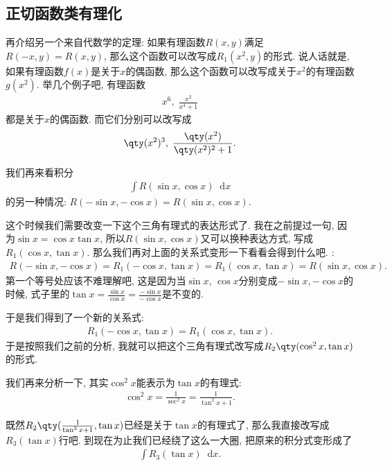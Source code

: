 \documentclass{ctexbook}
\newcommand*{\dif}{\mathop{}\!\mathrm{d}}
\begin{document}
{\subsection{正切函数类有理化}
再介绍另一个来自代数学的定理: 如果有理函数$R(x,y)$满足$R(-x,y)=R(x,y)$, 那么这个函数可以改写成$R_{1}(x^{2},y)$的形式. 说人话就是, 如果有理函数$f(x)$是关于$x$的偶函数, 那么这个函数可以改写成关于$x^{2}$的有理函数$g(x^{2})$. 举几个例子吧, 有理函数
\begin{align*}
x^{6},\;\frac{x^{2}}{x^{4}+1}
\end{align*}
都是关于$x$的偶函数. 而它们分别可以改写成
\begin{align*}
\qty(x^{2})^{3},\;\frac{\qty(x^{2})}{\qty(x^{2})^{2}+1}
.\end{align*}\par
我们再来看积分
\begin{align*}
\int R(\sin{x},\cos{x})\dif{x}
\end{align*}
的另一种情况: $R(-\sin{x},-\cos{x})=R(\sin{x},\cos{x})$. \par
这个时候我们需要改变一下这个三角有理式的表达形式了. 我在之前提过一句, 因为$\sin{x}=\cos{x}\tan{x}$, 所以$R(\sin{x},\cos{x})$又可以换种表达方式, 写成$R_{1}(\cos{x},\tan{x})$. 那么我们再对上面的关系式变形一下看看会得到什么吧. :
\begin{align*}
R(-\sin{x},-\cos{x})=R_{1}(-\cos{x},\tan{x})=R_{1}(\cos{x},\tan{x})=R(\sin{x},\cos{x})
.\end{align*}
第一个等号处应该不难理解吧, 这是因为当$\sin{x},\,\cos{x}$分别变成$-\sin{x},-\cos{x}$的时候, 式子里的$\tan{x}=\frac{\sin{x}}{\cos{x}}=\frac{-\sin{x}}{-\cos{x}}$是不变的. \par
于是我们得到了一个新的关系式: 
\begin{align*}
R_{1}(-\cos{x},\tan{x})=R_{1}(\cos{x},\tan{x})
.\end{align*}
于是按照我们之前的分析, 我就可以把这个三角有理式改写成$R_{2}\qty(\cos^{2}{x},\tan{x})$的形式. \par
我们再来分析一下, 其实$\cos^{2}{x}$能表示为$\tan{x}$的有理式: 
\begin{align*}
\cos^{2}{x}=\frac{1}{\sec^{2}{x}}=\frac{1}{\tan^{2}{x}+1}
.\end{align*}\par
既然$R_{2}\qty(\frac{1}{\tan^{2}{x}+1},\tan{x})$已经是关于$\tan{x}$的有理式了, 那么我直接改写成$R_{3}(\tan{x})$行吧. 
到现在为止我们已经绕了这么一大圈, 把原来的积分式变形成了
\begin{align*}
\int R_{3}(\tan{x})\dif{x}
.\end{align*}
}
\end{document}

